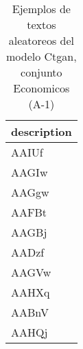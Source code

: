 \begin{table}[H]
\centering
\fontsize{8}{14}\selectfont
\caption{Ejemplos de textos aleatoreos del modelo Ctgan, conjunto Economicos (A-1)}
\label{table-sample10-economicos-a-1-ctgan-text}
\begin{tabular}{|m{50em}|}
\hline
\rowcolor[gray]{0.8}
description \\
\hline AAIUf \\
\hline AAGIw \\
\hline AAGgw \\
\hline AAFBt \\
\hline AAGBj \\
\hline AADzf \\
\hline AAGVw \\
\hline AAHXq \\
\hline AABnV \\
\hline AAHQj \\
\hline
\end{tabular}
\end{table}

